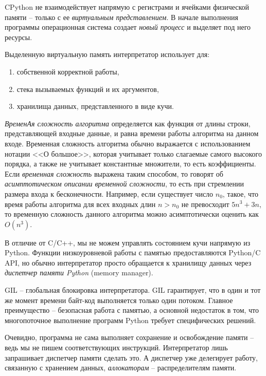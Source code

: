 \documentclass[%
	11pt,
	a4paper,
	utf8,
		]{article}
\begin{document}
CPython не взаимодействует напрямую с регистрами и ячейками  физической памяти -- только с ее \emph{виртуальным представлением}. В начале выполнения программы операционная система создает \emph{новый процесс} и выделяет под него ресурсы.

Выделенную виртуальную память интерпретатор использует для:
\begin{enumerate}
	\item собственной корректной работы,
	
	\item стека вызываемых функций и их аргументов,
	
	\item хранилища данных, представленного в виде кучи.
\end{enumerate}

\emph{ВременАя сложность алгоритма} определяется как функция от длины строки, представляющей входные данные, и равна времени работы алгоритма на данном входе. Временная сложность алгоритма обычно выражается с использованием нотации <<О большое>>, которая учитывает только слагаемые самого высокого порядка, а также не учитывает константные множители, то есть коэффициенты. Если \emph{временная сложность} выражена таким способом, то говорят об \emph{асимптотическом описании временной сложности}, то есть при стремлении размера входа к бесконечности. Например, если существует число $ n_0 $, такое, что время работы алгоритма для всех входных длин $ n > n_0 $ не превосходит $ 5 n^3 + 3 n $, то временную сложность данного алгоритма можно асимптотически оценить как $ O(n^3) $.

В отличие от C/C++, мы не можем управлять состоянием кучи напрямую из Python. Функции низкоуровневой работы с памятью предоставляются Python/C API, но обычно интерпретатор просто обращается к хранилищу данных через \emph{диспетчер памяти Python} (memory manager).

GIL -- глобальная блокировка интерпретатора. GIL гарантирует, что в один и тот же момент времени байт-код выполняется только один потоком. Главное преимущество -- безопасная работа с памятью, а основной недостаток в том, что многопоточное выполнение программ Python требует специфических решений.

Очевидно, программа не сама выполняет сохранение и освобождение памяти -- ведь мы не пишем соответствующих инструкций. Интерпретатор лишь запрашивает диспетчер памяти сделать это. А диспетчер уже делегирует работу, связанную с хранением данных, \emph{аллокаторам} -- распределителям памяти.
\end{document}
